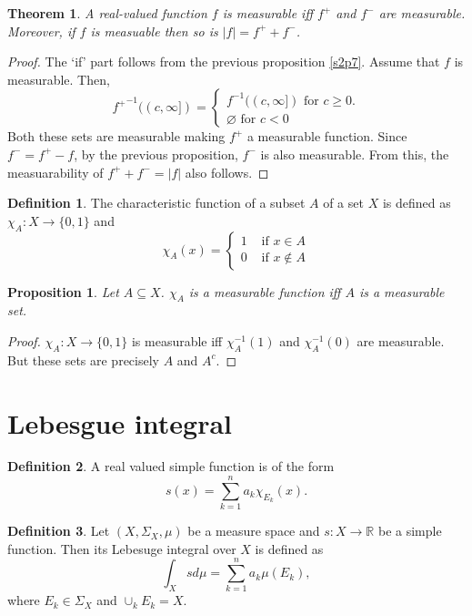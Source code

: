 \documentclass{article}
\newcommand{\sor}{\mathbb{R}}
\theoremstyle{plain}
\newtheorem{thm}{Theorem}
\numberwithin{thm}{section}
\theoremstyle{plain}
\newtheorem{prop}{Proposition}
\numberwithin{prop}{section}
\theoremstyle{definition}
\newtheorem{defn}{Definition}
\numberwithin{defn}{section}
\theoremstyle{remark}
\theoremstyle{plain}
\numberwithin{cor}{section}
\numberwithin{equation}{section}
\begin{document}
\begin{thm}\label{s1t1}
A real-valued function $f$ is measurable iff $f^+$ and $f^-$ are measurable. 
Moreover, if $f$ is measuable then so is $|f| = f^+ + f^-$.
\end{thm}
\begin{proof}
The `if' part follows from the previous proposition \ref{s2p7}. Assume that
$f$ is measurable. Then,
\[
{f^+}^{-1}((c, \infty]) = \begin{cases}
f^{-1}((c, \infty]) \text{ for } c \ge 0. \\
\varnothing \text{ for } c < 0
\end{cases}
\]
Both these sets are measurable making $f^+$ a measurable function. Since $f^- =
f^+ - f$, by the previous proposition, $f^-$ is also measurable. From this, the
measuarability of $f^+ + f^- = |f|$ also follows.
\end{proof}

\begin{defn}\label{s2d3}
The characteristic function of a subset $A$ of a set $X$ is defined as
$\chi_A: X \rightarrow \{0, 1\}$ and
\[
\chi_A(x) = \begin{cases} 1 & \text{ if } x \in A \\
0 & \text{ if } x \notin A
\end{cases}
\]
\end{defn}

\begin{prop}\label{s2p8}
Let $A \subseteq X$. $\chi_A$ is a measurable function iff $A$ is a measurable
set.
\end{prop}
\begin{proof}
$\chi_A: X \rightarrow \{0, 1\}$ is measurable iff $\chi_A^{-1}(1)$ and 
$\chi_A^{-1}(0)$ are measurable. But these sets are precisely $A$ and $A^c$.
\end{proof}

\section{Lebesgue integral}\label{s3}
\begin{defn}\label{s3d1}
A real valued simple function is of the form
\[
s(x) = \sum_{k=1}^n a_k \chi_{E_k}(x).
\]
\end{defn}

\begin{defn}\label{s3d2}
Let $(X, \Sigma_X, \mu)$ be a measure space and $s: X \rightarrow \sor$ be
a simple function. Then its Lebesuge integral over $X$ is defined as
\[
\int_Xs d\mu = \sum_{k=1}^na_k\mu(E_k),
\]
where $E_k \in \Sigma_X$ and $\cup_k E_k = X$.
\end{defn}
\end{document}
